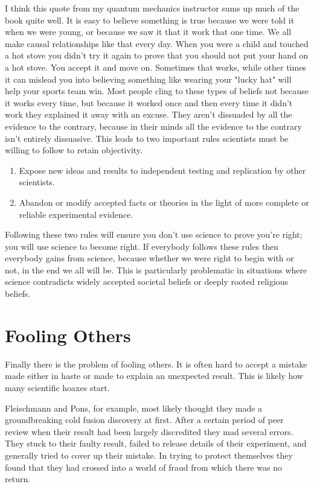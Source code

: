 \documentclass{article}
\begin{document}
I think this quote from my quantum mechanics instructor sums up much of the book quite well. It is easy to believe something is true because we were told it when we were young, or because we saw it that it work that one time. We all make causal relationships like that every day. When you were a child and touched a hot stove you didn't try it again to prove that you should not put your hand on a hot stove. You accept it and move on. Sometimes that works, while other times it can mislead you into believing something like wearing your "lucky hat" will help your sports team win. Most people cling to these types of beliefs not because it works every time, but because it worked once and then every time it didn't work they explained it away with an excuse. They aren't dissuaded by all the evidence to the contrary, because in their minds all the evidence to the contrary isn't entirely dissuasive. This leads to two important rules scientists must be willing to follow to retain objectivity. 

\begin{enumerate}
\item Expose new ideas and results to independent testing and replication by other scientists.
\item Abandon or modify accepted facts or theories in the light of more complete or reliable experimental evidence. 
\end{enumerate}

Following these two rules will ensure you don't use science to prove you're right; you will use science to become right. If everybody follows these rules then everybody gains from science, because whether we were right to begin with or not, in the end we all will be. 
This is particularly problematic in situations where science contradicts widely accepted societal beliefs or deeply rooted religious beliefs. 

\section{Fooling Others} 

Finally there is the problem of fooling others. It is often hard to accept a mistake made either in haste or made to explain an unexpected result. This is likely how many scientific hoaxes start. 

Fleischmann and Pons, for example, most likely thought they made a groundbreaking cold fusion discovery at first. After a certain period of peer review when their result had been largely discredited they mad several errors. They stuck to their faulty result, failed to release details of their experiment, and generally tried to cover up their mistake. In trying to protect themselves they found that they had crossed into a world of fraud from which there was no return. 
\end{document}

